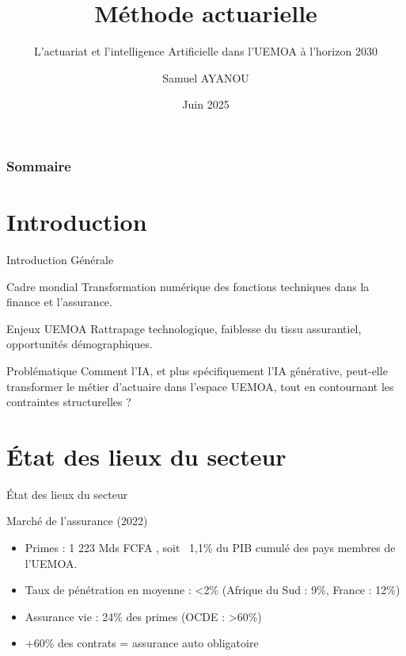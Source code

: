 \documentclass{beamer}
\title{Méthode actuarielle }
\subtitle{L'actuariat et l'intelligence Artificielle dans l'UEMOA à l'horizon 2030}
\author{Samuel AYANOU}
\institute{Ecole Nationale de la Statistique et de l'Analyse Economique\\
\textbf{Superviseur :} M. Babacar NDIAYE}
\date{Juin 2025}
\begin{document}
\frame{\titlepage}

\begin{frame}
\frametitle{Sommaire}
\tableofcontents
\end{frame}


\section{Introduction}
\begin{frame}{Introduction Générale}
	\begin{block}{Cadre mondial}
		Transformation numérique des fonctions techniques dans la finance et l’assurance.
	\end{block}
	\begin{block}{Enjeux UEMOA}
		Rattrapage technologique, faiblesse du tissu assurantiel, opportunités démographiques.
	\end{block}
	\begin{block}{Problématique}
		Comment l’IA, et plus spécifiquement l’IA générative, peut-elle transformer le métier d’actuaire dans l’espace UEMOA, tout en contournant les contraintes structurelles ?
	\end{block}
\end{frame}
\section{État des lieux du secteur}
\begin{frame}{État des lieux du secteur}
	\begin{block}{Marché de l’assurance (2022)}
		\begin{itemize}
			\item Primes : 1 223 Mds FCFA , soit ~1,1\% du PIB cumulé des pays membres de l’UEMOA.
			\item Taux de pénétration en moyenne : <2\% (Afrique du Sud : 9\%, France : 12\%)
			\item Assurance vie : 24\% des primes (OCDE : >60\%)
			\item +60\% des contrats = assurance auto obligatoire
		\end{itemize}
	\end{block}
\end{frame}
\end{document}
